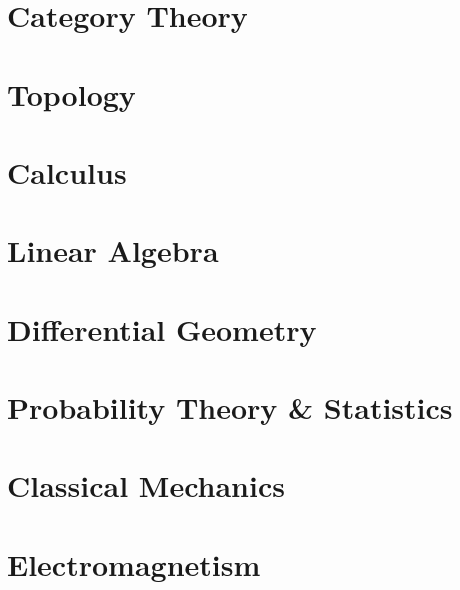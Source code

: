 \documentclass[11pt, a4paper]{report}
\begin{document}
\part{Category Theory}




\part{Topology}






\part{Calculus}








\part{Linear Algebra}









\part{Differential Geometry}\label{part:diffgeom}














\part{Probability Theory \& Statistics}


%

\part{Classical Mechanics}







\part{Electromagnetism}



\end{document}

